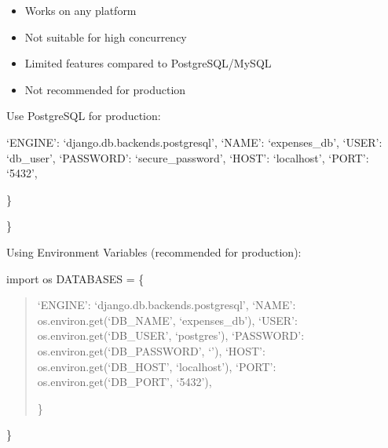 \documentclass[letterpaper,10pt,english]{sphinxmanual}
\begin{document}
\begin{fulllineitems}
\begin{description}
\begin{itemize}
\item {} 
\sphinxAtStartPar
Works on any platform

\end{itemize}

\begin{itemize}
\item {} 
\sphinxAtStartPar
Not suitable for high concurrency

\item {} 
\sphinxAtStartPar
Limited features compared to PostgreSQL/MySQL

\item {} 
\sphinxAtStartPar
Not recommended for production

\end{itemize}

\sphinxAtStartPar
Use PostgreSQL for production:
\begin{description}
\begin{description}
\sphinxAtStartPar
‘ENGINE’: ‘django.db.backends.postgresql’,
‘NAME’: ‘expenses\_db’,
‘USER’: ‘db\_user’,
‘PASSWORD’: ‘secure\_password’,
‘HOST’: ‘localhost’,
‘PORT’: ‘5432’,

\end{description}

\sphinxAtStartPar
\}

\end{description}

\sphinxAtStartPar
\}

\sphinxAtStartPar
Using Environment Variables (recommended for production):

\sphinxAtStartPar
import os
DATABASES = \{
\begin{quote}
\begin{description}
\sphinxAtStartPar
‘ENGINE’: ‘django.db.backends.postgresql’,
‘NAME’: os.environ.get(‘DB\_NAME’, ‘expenses\_db’),
‘USER’: os.environ.get(‘DB\_USER’, ‘postgres’),
‘PASSWORD’: os.environ.get(‘DB\_PASSWORD’, ‘’),
‘HOST’: os.environ.get(‘DB\_HOST’, ‘localhost’),
‘PORT’: os.environ.get(‘DB\_PORT’, ‘5432’),

\end{description}

\sphinxAtStartPar
\}
\end{quote}

\sphinxAtStartPar
\}

\end{description}

\end{fulllineitems}
\end{document}
